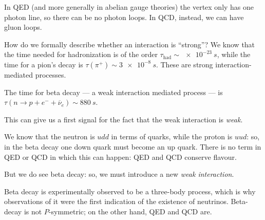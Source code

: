 \documentclass[main.tex]{subfiles}
\begin{document}
In QED (and more generally in abelian gauge theories) the vertex only has one photon line, so there can be no photon loops. 
In QCD, instead, we can have gluon loops.

How do we formally describe whether an interaction is ``strong''?
We know that the time needed for hadronization  is of the order \(\tau _{\text{had}} \sim \SI{e-23}{s}\), while the time for a pion's decay is \(\tau (\pi^{+}) \sim \SI{3e-8}{s}\). These are strong interaction-mediated processes.

The time for beta decay --- a weak interaction mediated process --- is \(\tau (n \to p + e^{-} + \overline{\nu}_{e}) \sim \SI{880}{s}\). 

This can give us a first signal for the fact that the weak interaction is \emph{weak}. 

We know that the neutron is \(u d d \) in terms of quarks, while the proton is \(u u d\): so, in the beta decay one down quark must become an up quark. 
There is no term in QED or QCD in which this can happen: QED and QCD conserve flavour.

But we do see beta decay: so, we must introduce a new \emph{weak interaction}.

Beta decay is experimentally observed to be a three-body process, which is why observations of it were the first indication of the existence of neutrinos. 
Beta-decay is not \(P\)-symmetric; on the other hand, QED and QCD are.
\end{document}
